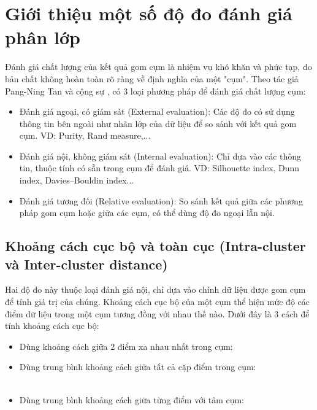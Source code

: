 \section{Giới thiệu một số độ đo đánh giá phân lớp} \label{clusterEvalMetrics}
Đánh giá chất lượng của kết quả gom cụm là nhiệm vụ khó khăn và phức tạp, do bản chất không hoàn toàn rõ ràng về định nghĩa của một "cụm". Theo tác giả Pang-Ning Tan và cộng sự \cite{IntroToDM}, có 3 loại phương pháp để đánh giá chất lượng cụm: 
	\begin{itemize}
		\item Đánh giá ngoại, có giám sát (External evaluation): Các độ đo có sử dụng thông tin bên ngoài như nhãn lớp của dữ liệu để so sánh với kết quả gom cụm.
		VD: Purity, Rand measure,...
		\item Đánh giá nội, không giám sát (Internal evaluation): Chỉ dựa vào các thông tin, thuộc tính có sẵn trong cụm để đánh giá.
		VD: Silhouette index, Dunn index, Davies–Bouldin index...
		\item Đánh giá tương đối (Relative evaluation): So sánh kết quả giữa các phương pháp gom cụm hoặc giữa các cụm, có thể dùng độ đo ngoại lẫn nội.
	\end{itemize}

	\subsection{Khoảng cách cục bộ và toàn cục (Intra-cluster và Inter-cluster distance)} \label{localglobaldistance}
	Hai độ đo này thuộc loại đánh giá nội, chỉ dựa vào chính dữ liệu được gom cụm để tính giá trị của chúng. Khoảng cách cục bộ của một cụm thể hiện mức độ các điểm dữ liệu trong một cụm tương đồng với nhau thế nào. Dưới đây là 3 cách để tính khoảng cách cục bộ:
		\begin{itemize}
			\item Dùng khoảng cách giữa 2 điểm xa nhau nhất trong cụm:\\
			
			\item Dùng trung bình khoảng cách giữa tất cả cặp điểm trong cụm:\\
			\\
			
			\item Dùng trung bình khoảng cách giữa từng điểm với tâm cụm:\\
			\\	
		\end{itemize}
	
